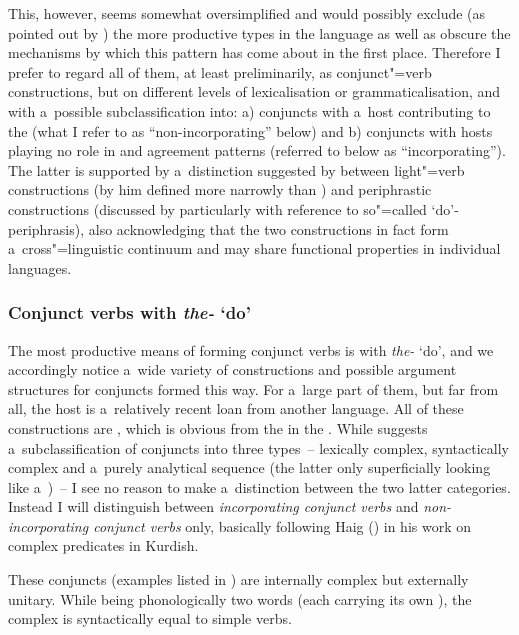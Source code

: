 \begin{exe}
This, however, seems somewhat oversimplified and would possibly exclude (as pointed out by \citealt[160]{masica1993}) the more productive types in the language as well as obscure the mechanisms by which this pattern has come about in the first place. Therefore I prefer to regard all of them, at least preliminarily, as conjunct"=verb constructions, but on different levels of lexicalisation or grammaticalisation, and with a~possible subclassification into: a) conjuncts with a~host contributing to the  (what I refer to as ``non-incorporating'' below) and b) conjuncts with hosts playing no role in  and agreement patterns (referred to below as ``incorporating''). The latter is supported by a~distinction suggested by \citet[69--74]{jaeger2006} between light"=verb constructions (by him defined more narrowly than \citealt{butt2010}) and periphrastic constructions (discussed by \citeauthor{jaeger2006} particularly with reference to so"=called `do'-periphrasis), also acknowledging that the two constructions in fact form a~cross"=linguistic continuum and may share functional properties in individual languages. 



\subsubsection*{Conjunct verbs with \textit{the-} `do'}

The most productive means of forming conjunct verbs is with \textit{the-} `do', and we accordingly notice a~wide variety of constructions and possible argument structures for conjuncts formed this way. For a~large part of them, but far from all, the host is a~relatively recent loan from another language. All of these constructions are , which is obvious from the  in the . While \citet[201]{verma1993} suggests a~subclassification of conjuncts into three types~-- lexically complex, syntactically complex and a~purely analytical sequence (the latter only superficially looking like a~)~-- I see no reason to make a~distinction between the two latter categories. Instead I will distinguish between \textit{incorporating conjunct verbs} and \textit{non-incorporating conjunct verbs} only, basically following Haig (\citeyear{haig2002}) in his work on complex predicates in Kurdish.


 These conjuncts (examples listed in ) are internally complex but externally unitary. While being phonologically two words (each carrying its own ), the complex is syntactically equal to simple  verbs.



\end{exe}
